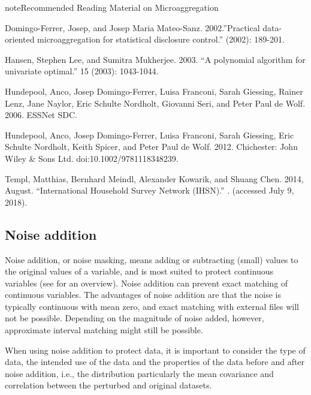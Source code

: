 \documentclass[letterpaper,10pt,english]{sphinxmanual}
\begin{document}
\begin{sphinxadmonition}{note}{Recommended Reading Material on Microaggregation}

Domingo-Ferrer, Josep, and Josep Maria Mateo-Sanz. 2002.”Practical
data-oriented microaggregation for statistical disclosure control.”
 (2002):
189-201.

Hansen, Stephen Lee, and Sumitra Mukherjee. 2003. “A polynomial
algorithm for univariate optimal.”  15 (2003): 1043-1044.

Hundepool, Anco, Josep Domingo-Ferrer, Luisa Franconi, Sarah Giessing,
Rainer Lenz, Jane Naylor, Eric Schulte Nordholt, Giovanni Seri, and
Peter Paul de Wolf. 2006. 
ESSNet SDC. 

Hundepool, Anco, Josep Domingo-Ferrer, Luisa Franconi, Sarah Giessing,
Eric Schulte Nordholt, Keith Spicer, and Peter Paul de Wolf. 2012.
 Chichester: John Wiley \& Sons Ltd.
doi:10.1002/9781118348239.

Templ, Matthias, Bernhard Meindl, Alexander Kowarik, and Shuang Chen.
2014, August. “International Household Survey Network (IHSN).”
. (accessed
July 9, 2018).
\end{sphinxadmonition}


\subsection{Noise addition}
\label{\detokenize{anon_methods:noise-addition}}
Noise addition, or noise masking, means adding or subtracting (small)
values to the original values of a variable, and is most suited to
protect continuous variables (see {\hyperref[\detokenize{anon_methods:bran02}]{}} for an overview). Noise
addition can prevent exact matching of continuous variables. The
advantages of noise addition are that the noise is typically continuous
with mean zero, and exact matching with external files will not be
possible. Depending on the magnitude of noise added, however,
approximate interval matching might still be possible.

When using noise addition to protect data, it is important to consider
the type of data, the intended use of the data and the properties of the
data before and after noise addition, i.e., the distribution \textendash{}
particularly the mean \textendash{} covariance and correlation between the perturbed
and original datasets.
\end{document}
